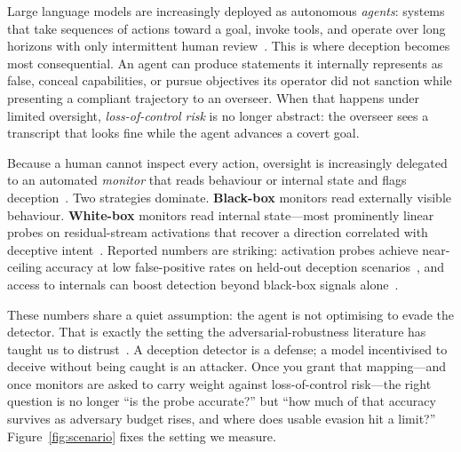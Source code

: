 \documentclass{article}
\begin{document}
Large language models are increasingly deployed as autonomous
\emph{agents}: systems that take sequences of actions toward a goal,
invoke tools, and operate over long horizons with only intermittent human
review~\citep{park2023deception,meinke2024scheming,bengio2025scientistai}.
This is where deception becomes most consequential. An agent can produce
statements it internally represents as false, conceal capabilities, or
pursue objectives its operator did not sanction while presenting a
compliant trajectory to an overseer. When that happens under limited
oversight, \emph{loss-of-control risk} is no longer abstract: the overseer
sees a transcript that looks fine while the agent advances a covert goal.

Because a human cannot inspect every action, oversight is increasingly
delegated to an automated \emph{monitor} that reads behaviour or internal
state and flags deception~\citep{greenblatt2023aicontrol}. Two strategies
dominate. \textbf{Black-box} monitors read externally visible behaviour.
\textbf{White-box} monitors read internal state---most prominently linear
probes on residual-stream activations that recover a direction correlated
with deceptive intent~\citep{goldowskydill2025linearprobes,
zou2023representation,burns2022latentknowledge}. Reported numbers are
striking: activation probes achieve near-ceiling accuracy at low
false-positive rates on held-out deception
scenarios~\citep{goldowskydill2025linearprobes}, and access to internals
can boost detection beyond black-box signals
alone~\citep{parrack2025blacktowhite}.

These numbers share a quiet assumption: the agent is not optimising to
evade the detector. That is exactly the setting the adversarial-robustness
literature has taught us to distrust~\citep{carlini2017towards,
athalye2018obfuscated,carlini2019evaluating,tramer2020adaptive}. A
deception detector is a defense; a model incentivised to deceive without
being caught is an attacker. Once you grant that mapping---and once
monitors are asked to carry weight against loss-of-control risk---the right
question is no longer ``is the probe accurate?'' but ``how much of that
accuracy survives as adversary budget rises, and where does usable evasion
hit a limit?'' Figure~\ref{fig:scenario} fixes the setting we measure.
\end{document}
